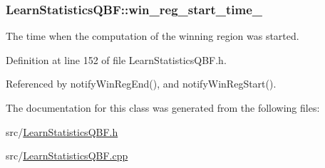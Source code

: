 \hypertarget{classLearnStatisticsQBF_a2c1d2ca27ab1a5edf496ffd603ba0878}{
\subsubsection[{win\-\_\-reg\-\_\-start\-\_\-time\-\_\-}]{ Learn\-Statistics\-Q\-B\-F\-::win\-\_\-reg\-\_\-start\-\_\-time\-\_\-\hspace{0.3cm}{\ttfamily [protected]}}}\label{classLearnStatisticsQBF_a2c1d2ca27ab1a5edf496ffd603ba0878}


The time when the computation of the winning region was started. 



Definition at line 152 of file Learn\-Statistics\-Q\-B\-F.\-h.



Referenced by notify\-Win\-Reg\-End(), and notify\-Win\-Reg\-Start().



The documentation for this class was generated from the following files\-:\begin{DoxyCompactItemize}
\item 
src/\hyperlink{LearnStatisticsQBF_8h}{Learn\-Statistics\-Q\-B\-F.\-h}\item 
src/\hyperlink{LearnStatisticsQBF_8cpp}{Learn\-Statistics\-Q\-B\-F.\-cpp}\end{DoxyCompactItemize}
